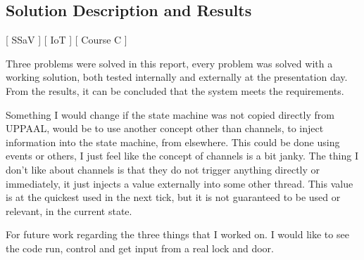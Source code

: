 \subsection{Solution Description and Results}
[ SSaV ] [ IoT ] [ Course C ] 
\newline

Three problems were solved in this report, every problem was solved with a working solution, both tested internally and externally at the presentation day.
From the results, it can be concluded that the system meets the requirements.

Something I would change if the state machine was not copied directly from UPPAAL, would be to use another concept other than channels, to inject information into the state machine, from elsewhere.
This could be done using events or others, I just feel like the concept of channels is a bit janky.
The thing I don't like about channels is that they do not trigger anything directly or immediately, it just injects a value externally into some other thread.
This value is at the quickest used in the next tick, but it is not guaranteed to be used or relevant, in the current state.

For future work regarding the three things that I worked on.
I would like to see the code run, control and get input from a real lock and door.